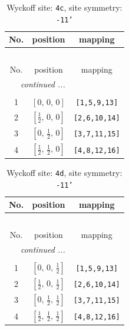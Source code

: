 \documentclass[fleqn,8pt]{jsarticle}
\begin{document}
\renewcommand{\arraystretch}{1.2}
\begin{longtable}{ccc}
\caption{Wyckoff site: {\tt 4c}, site symmetry: {\tt -11'}}
 \\
 \hline \hline
No. & position & mapping \\ \hline \endfirsthead

\multicolumn{2}{l}{\tablename\ \thetable{}} \\
 \hline \hline
No. & position & mapping \\ \hline \endhead

 \hline \hline
\multicolumn{2}{r}{\footnotesize\it continued ...} \\ \endfoot

 \hline \hline
\multicolumn{2}{r}{} \\ \endlastfoot

1 & $\left[ 0,\, 0,\, 0 \right]$ & {\tt [1,5,9,13]} \\ \hline
2 & $\left[ \frac{1}{2},\, 0,\, 0 \right]$ & {\tt [2,6,10,14]} \\ \hline
3 & $\left[ 0,\, \frac{1}{2},\, 0 \right]$ & {\tt [3,7,11,15]} \\ \hline
4 & $\left[ \frac{1}{2},\, \frac{1}{2},\, 0 \right]$ & {\tt [4,8,12,16]} \\
\end{longtable}
\renewcommand{\arraystretch}{1.2}
\begin{longtable}{ccc}
\caption{Wyckoff site: {\tt 4d}, site symmetry: {\tt -11'}}
 \\
 \hline \hline
No. & position & mapping \\ \hline \endfirsthead

\multicolumn{2}{l}{\tablename\ \thetable{}} \\
 \hline \hline
No. & position & mapping \\ \hline \endhead

 \hline \hline
\multicolumn{2}{r}{\footnotesize\it continued ...} \\ \endfoot

 \hline \hline
\multicolumn{2}{r}{} \\ \endlastfoot

1 & $\left[ 0,\, 0,\, \frac{1}{2} \right]$ & {\tt [1,5,9,13]} \\ \hline
2 & $\left[ \frac{1}{2},\, 0,\, \frac{1}{2} \right]$ & {\tt [2,6,10,14]} \\ \hline
3 & $\left[ 0,\, \frac{1}{2},\, \frac{1}{2} \right]$ & {\tt [3,7,11,15]} \\ \hline
4 & $\left[ \frac{1}{2},\, \frac{1}{2},\, \frac{1}{2} \right]$ & {\tt [4,8,12,16]} \\
\end{longtable}
\end{document}
